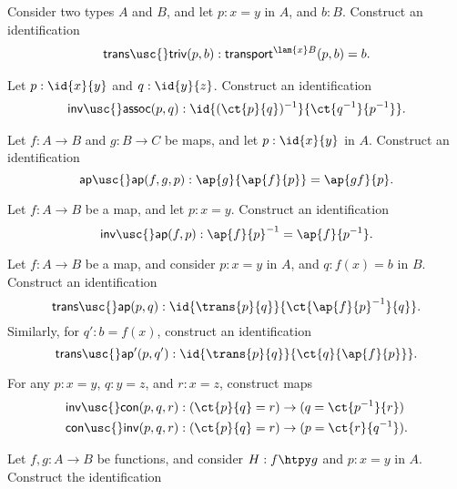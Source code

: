 \begin{exercises}
\item \label{ex:trans_triv}Consider two types $A$ and $B$, and let $p:x=y$ in $A$, and $b:B$. Construct an identification
\begin{align*}
\mathsf{trans\usc{}triv}(p,b):\mathsf{transport}^{\lam{x}B}(p,b)=b.
\end{align*}
\item \label{ex:inv_assoc}Let $p:\id{x}{y}$ and $q:\id{y}{z}$. Construct an identification
\begin{align*}
\mathsf{inv\usc{}assoc}(p,q):\id{(\ct{p}{q})^{-1}}{\ct{q^{-1}}{p^{-1}}}.
\end{align*}
\item \label{ex:ap_ap}Let $f:A\to B$ and $g:B\to C$ be maps, and let $p:\id{x}{y}$ in $A$. Construct an identification
\begin{equation*}
\mathsf{ap\usc{}ap}(f,g,p):\ap{g}{\ap{f}{p}}=\ap{gf}{p}.
\end{equation*}
\item \label{ex:inv_ap}Let $f:A\to B$ be a map, and let $p:x=y$. Construct an identification 
\begin{equation*}
\mathsf{inv\usc{}ap}(f,p):\ap{f}{p}^{-1}=\ap{f}{p^{-1}}.
\end{equation*} 
\item \label{ex:trans_ap}Let $f:A\to B$ be a map, and consider $p:x=y$ in $A$, and $q:f(x)=b$ in $B$. Construct an identification
\begin{equation*}
\mathsf{trans\usc{}ap}(p,q):\id{\trans{p}{q}}{\ct{\ap{f}{p}^{-1}}{q}}.
\end{equation*}
Similarly, for $q':b=f(x)$, construct an identification
\begin{equation*}
\mathsf{trans\usc{}ap'}(p,q'):\id{\trans{p}{q}}{\ct{q}{\ap{f}{p}}}.
\end{equation*}
\item \label{ex:inv_con}For any $p:x=y$, $q:y=z$, and $r:x=z$, construct maps
\begin{align*}
\mathsf{inv\usc{}con}(p,q,r) & : (\ct{p}{q}=r)\to (q=\ct{p^{-1}}{r}) \\
\mathsf{con\usc{}inv}(p,q,r) & : (\ct{p}{q}=r)\to (p=\ct{r}{q^{-1}}).
\end{align*}
\item \label{ex:htpy_nat}
\begin{subexenum}
\item Let $f,g:A\to B$ be functions, and consider $H:f\htpy g$ and $p:x=y$ in $A$. Construct the identification

\end{subexenum}
\end{exercises}
